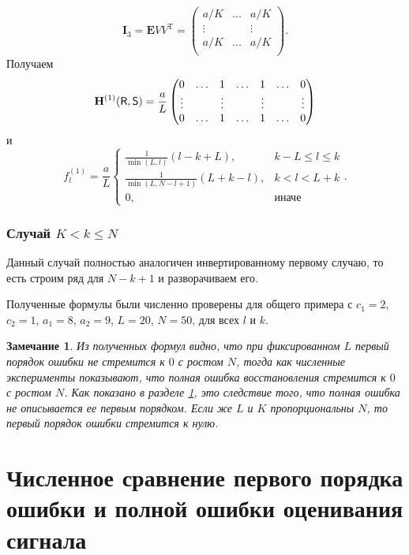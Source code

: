 \documentclass[specialist,
               substylefile = spbu.rtx,
               subf,href,colorlinks=true, 12pt]{disser}
\newtheorem{remark}{Замечание}
\begin{document}
$$\mathbf{I}_3 = \mathbf{E} V V^{\mathrm{T}} = \begin{pmatrix}
	a/K &  \ldots & a/K\\
	\vdots & & \vdots\\
	a/K &  \ldots & a/K\\
\end{pmatrix}.$$
Получаем
$$\mathbf{H}^{(1)}(\textsf{R}, \textsf{S}) = \frac{a}{L}\begin{pmatrix}
	0 & \ldots & 1 & \ldots & 1 & \ldots & 0\\
	\vdots & & \vdots & & \vdots & & \vdots\\
	0 & \ldots & 1 & \ldots & 1 & \ldots & 0
\end{pmatrix}$$
и
$$f^{(1)}_l = \frac{a}{{L}}
\begin{cases}
	\frac{1}{\min(L, l)}(l - k + L), & \text{$k - L \leq l \leq k$}\\
	\frac{1}{\min(L, N - l + 1)}(L + k - l), & \text{$k < l < L + k$}\\
	0, & \text{иначе}
\end{cases}.$$


\subsubsection{Случай $K < k \leq N$}
Данный случай полностью аналогичен инвертированному первому случаю, то есть строим ряд для $N - k + 1$ и разворачиваем его.

\vspace{1em}
Полученные формулы были численно проверены для общего примера с $c_1 = 2$, $c_2 = 1$, $a_1 = 8$, $a_2 = 9$, $L = 20$, $N = 50$, для всех $l$ и $k$.

\begin{remark}
	Из полученных формул видно, что при фиксированном $L$ первый порядок ошибки не стремится к $0$ с ростом $N$, тогда как численные эксперименты показывают, что полная ошибка восстановления стремится к $0$ с ростом $N$. Как показано в разделе \ref{sec:results}, это следствие того, что полная ошибка не описывается ее первым порядком. Если же $L$ и $K$ пропорциональны $N$, то первый порядок ошибки стремится к нулю.
\end{remark}


\section{Численное сравнение первого порядка ошибки и полной ошибки оценивания сигнала}
\label{sec:results}
\end{document}
